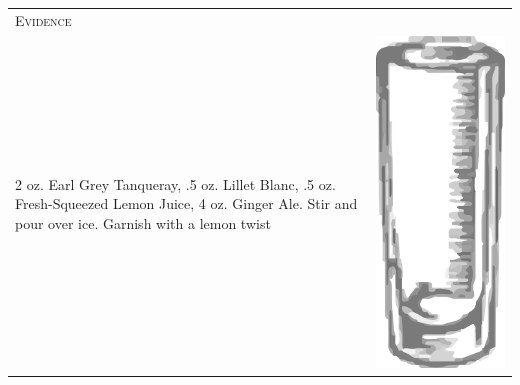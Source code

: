 \documentclass{article}
\begin{document}
\begin{tabular}{p{2in} p{0.5in}}
\multicolumn{2}{p{3in}}{\centering\Huge\textsc{Evidence}}\\ 
  \vspace{-0.1in}2 oz. Earl Grey Tanqueray, .5 oz. Lillet Blanc, .5 oz. Fresh-Squeezed Lemon Juice, 4 oz. Ginger Ale. Stir and pour over ice. Garnish with a lemon twist &
  \vspace{-0.1in} \includegraphics{collins.png}
\end{tabular}
\end{document}
